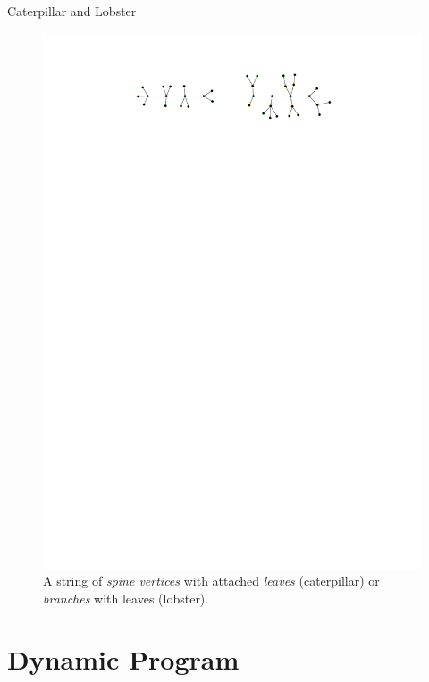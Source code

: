 \documentclass[aspectratio=169,notes]{beamer}
\begin{document}
\begin{frame}{Caterpillar and Lobster}

\begin{figure}
    \centering
    \includegraphics{ch2_caterpillar_lobster.pdf}
   \caption*{A string of \emph{spine vertices} with attached \emph{leaves} (caterpillar) or \emph{branches} with leaves (lobster).}
\end{figure}
    
\end{frame}


\section{Dynamic Program}
\end{document}
